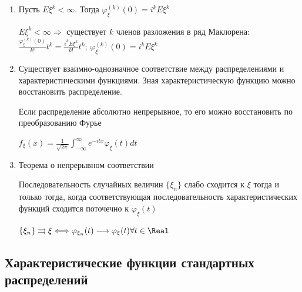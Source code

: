 \documentclass[12pt]{article}
\begin{document}
\begin{enumerate}
    \item Пусть $E\xi^k < \infty$. Тогда $\varphi_\xi^{(k)}(0) = i^k E\xi^k$

    \begin{MyProof}
        $E\xi^k < \infty \Longrightarrow$ существует $k$ членов разложения в ряд Маклорена: 
        $\frac{\varphi_\xi^{(k)}(0)}{k!}t^k = \frac{i^k E\xi^k}{k!} t^k$; $\varphi_\xi^{(k)}(0) = i^k E\xi^k$
    \end{MyProof}

    \item Существует взаимно-однозначное соответствие между распределениями и характеристическими функциями.
    Зная характеристическую функцию можно восстановить распределение.

    \Ex Если распределение абсолютно непрерывное, то его можно восстановить по преобразованию Фурье

    $f_\xi(x) = \frac{1}{\sqrt{2\pi}} \int_{-\infty}^{\infty} e^{-itx} \varphi_\xi(t) dt$

    \item Теорема о непрерывном соответствии
    
    \begin{MyTheorem}
        \Ths Последовательность случайных величин $\{\xi_n\}$ слабо сходится к $\xi$ тогда и только тогда, когда
        соответствующая последовательность характеристических функций сходится поточечно к $\varphi_\xi(t)$

        $\{\xi_n\} \rightrightarrows \xi \Longleftrightarrow \varphi_{\xi_n}(t) \longrightarrow \varphi_\xi(t) \forall t \in \Real$
    \end{MyTheorem}

\end{enumerate}

\subsection{Характеристические функции стандартных распределений}

\hypertarget{characteristicfunctionofstandarddistributions}{}
\end{document}
